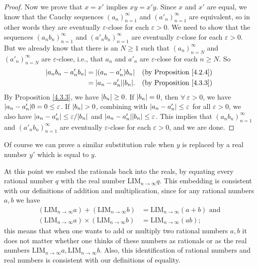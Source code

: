 \begin{proof}
Now we prove that \(x = x'\) implies \(xy = x'y\).
Since \(x\) and \(x'\) are equal, we know that the Cauchy sequences \((a_n)_{n = 1}^{\infty}\) and \((a'_n)_{n = 1}^{\infty}\) are equivalent, so in other words they are eventually \(\varepsilon\)-close for each \(\varepsilon > 0\).
We need to show that the sequences \((a_n b_n)_{n = 1}^{\infty}\) and \((a'_n b_n)_{n = 1}^{\infty}\) are eventually \(\varepsilon\)-close for each \(\varepsilon > 0\).
But we already know that there is an \(N \geq 1\) such that \((a_n)_{n = N}^{\infty}\) and \((a'_n)_{n = N}^{\infty}\) are \(\varepsilon\)-close, i.e., that \(a_n\) and \(a'_n\) are \(\varepsilon\)-close for each \(n \geq N\).
So
\begin{align*}
\abs*{a_n b_n - a'_n b_n} &= \abs*{(a_n - a'_n)b_n} & \text{(by Proposition \ref{4.2.4})} \\
&= \abs*{a_n - a'_n}\abs*{b_n}. & \text{(by Proposition \ref{4.3.3})}
\end{align*}
By Proposition \ref{4.3.3}, we have \(\abs*{b_n} \geq 0\).
If \(\abs*{b_n} = 0\), then \(\forall\ \varepsilon > 0\), we have \(\abs*{a_n - a'_n} 0 = 0 \leq \varepsilon\).
If \(\abs*{b_n} > 0\), combining with \(\abs*{a_n - a'_n} \leq \varepsilon\) for all \(\varepsilon > 0\), we also have \(\abs*{a_n - a'_n} \leq \varepsilon / \abs*{b_n}\) and \(\abs*{a_n - a'_n}\abs*{b_n} \leq \varepsilon\).
This implies that \((a_n b_n)_{n = 1}^{\infty}\) and \((a'_n b_n)_{n = 1}^{\infty}\) are eventually \(\varepsilon\)-close for each \(\varepsilon > 0\), and we are done.
\end{proof}

\begin{note}
Of course we can prove a similar substitution rule when \(y\) is replaced by a real number \(y'\) which is equal to \(y\).
\end{note}

\begin{note}
At this point we embed the rationals back into the reals, by equating every rational number \(q\) with the real number \(\text{LIM}_{n \to \infty} q\).
This embedding is consistent with our definitions of addition and multiplication, since for any rational numbers \(a, b\) we have
\begin{align*}
(\text{LIM}_{n \to \infty} a) + (\text{LIM}_{n \to \infty} b) &= \text{LIM}_{n \to \infty} (a + b) \text{ and} \\
(\text{LIM}_{n \to \infty} a) \times (\text{LIM}_{n \to \infty} b) &= \text{LIM}_{n \to \infty} (ab);
\end{align*}
this means that when one wants to add or multiply two rational numbers \(a, b\) it does not matter whether one thinks of these numbers as rationals or as the real numbers \(\text{LIM}_{n \to \infty} a, \text{LIM}_{n \to \infty} b\).
Also, this identification of rational numbers and real numbers is consistent with our definitions of equality.
\end{note}

